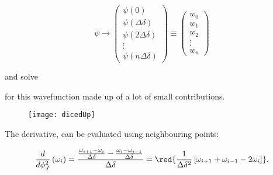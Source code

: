    \[
     \psi \rightarrow \begin{pmatrix}
       \psi(0)\\
       \psi(\Delta \delta)\\
       \psi(2\Delta \delta)\\\vdots
       \\
       \psi(n\Delta \delta)
     \end{pmatrix}
     \equiv
     \begin{pmatrix}
       w_0\\
       w_1\\
       w_2\\
       \vdots\\
       w_{n}
     \end{pmatrix}
   \]

   \noindent and solve


   \noindent  for  this   wavefunction  made  up  of  a   lot  of  small
   contributions.

\begin{figure}[h]
  \centering \texttt{[image: dicedUp]}
\end{figure}

\noindent

\noindent The derivative, can be evaluated using neighbouring points:

   \begin{equation}\label{eqn:flux_2}
     \frac{d}{d\phi_J^2}\left(\omega_i\right) = \frac{\frac{\omega_{i+1} - \omega_i}{\Delta\delta} - \frac{\omega_{i} - \omega_{i-1}}{\Delta\delta}}{\Delta\delta} = \red{\frac{1}{\Delta\delta^2}\left[\omega_{i+1}+\omega_{i-1}-2\omega_{i}\right]}.
   \end{equation}

